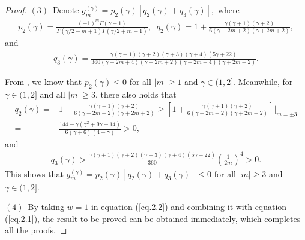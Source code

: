 \documentclass{siamart171218}
\numberwithin{theorem}{section}
\numberwithin{equation}{section}
\begin{document}
\begin{proof}
$\mathrm{(3)}$~Denote
$
g_{m}^{(\gamma)}=p_2(\gamma)\left[q_2(\gamma)+q_3(\gamma)\right],
$
where
\begin{equation*}
\begin{aligned}\displaystyle
p_2(\gamma)=
\frac{(-1)^m \Gamma\left(\gamma+1\right)}
{\Gamma\left({\gamma}/2-m+1\right)\Gamma\left({\gamma}/2+m+1\right)},\;\;
q_2(\gamma)=1+\frac{\gamma\left(\gamma+1\right)\left(\gamma+2\right)}
{6\left(\gamma-2m+2\right)
\left(\gamma+2m+2\right)},
\end{aligned}
\end{equation*}
and
\begin{equation*}
\begin{aligned}\displaystyle
q_3(\gamma)=
\frac{\gamma(\gamma+1)(\gamma+2)(\gamma+3)(\gamma+4)(5\gamma+22)}
{360\left(\gamma-2m+4\right)\left(\gamma-2m+2\right)
\left(\gamma+2m+4\right)\left(\gamma+2m+2\right)}.
\end{aligned}
\end{equation*}

From \cite{Celik2012}, we know that $p_2(\gamma)\leq0$ for all $|m|\geq1$ and $\gamma\in(1,2]$.
Meanwhile, for $\gamma\in(1,2]$ and all $|m|\geq3$,
there also holds that
\begin{equation*}
\begin{aligned}\displaystyle
q_2(\gamma)=&\displaystyle1+\frac{\gamma(\gamma+1)(\gamma+2)}
{6\left(\gamma-2m+2\right)
\left(\gamma+2m+2\right)}\geq
\left[1+\frac{\gamma(\gamma+1)(\gamma+2)}{6\left(\gamma-2m+2\right)
\left(\gamma+2m+2\right)}\right]\Bigg|_{m=\pm3}\\\displaystyle
=&\displaystyle\frac{144-\gamma(\gamma^2+9\gamma+14)}{6\left(\gamma+6\right)
\left(4-\gamma\right)}>0,
\end{aligned}
\end{equation*}
and
\begin{equation*}
\begin{aligned}\displaystyle
q_3(\gamma)>
\frac{\gamma(\gamma+1)(\gamma+2)(\gamma+3)(\gamma+4)(5\gamma+22)}
{360}
\left(\frac{1}{2m}\right)^4>0.
\end{aligned}
\end{equation*}
This shows that
$g_{m}^{(\gamma)}=p_2(\gamma)\left[q_2(\gamma)+q_3(\gamma)\right]\leq0$
for all $|m|\geq3$ and $\gamma\in(1,2]$.

$\mathrm{(4)}$~By taking $w=1$ in equation (\ref{eq.2.2}) and combining it
with equation (\ref{eq.2.1}), the result to be
proved can be obtained immediately, which completes all the proofs.
\end{proof}
\end{document}
